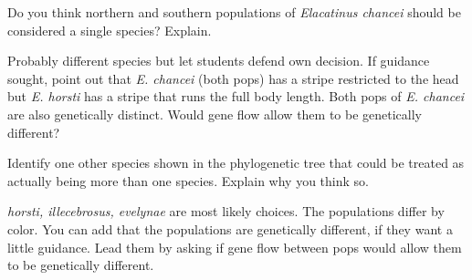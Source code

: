 \documentclass[12pt, hidelinks]{exam}
\newcommand*\AnswerBox[2]{%
    \parbox[t][#1]{0.92\textwidth}{%
    \begin{solution}#2\end{solution}}
    \vspace{\stretch{1}}
}
\begin{document}
\begin{questions}
\question[Checkout]
Do you think northern and southern populations of 
\textit{Elacatinus chancei} should be considered a single species?
Explain.

\AnswerBox{3\baselineskip}{Probably different species but let students defend own decision. 
If guidance sought, point out that \textit{E. chancei} (both pops) has a stripe restricted to the head
but \textit{E. horsti} has a stripe that runs the full body length. Both pops of \textit{E. chancei} are also
genetically distinct. Would gene flow allow them to be genetically different?}

\question[Checkout]
Identify one other species shown in the phylogenetic tree
that could be treated as actually being more than one species. Explain why you think so.

\AnswerBox{3\baselineskip}{\textit{horsti, illecebrosus, evelynae} are most likely choices. 
The populations differ by color. You can add that the populations are genetically different, if 
they want a little guidance. Lead them by asking if gene flow between pops would allow them
to be genetically different.}


%
%

\end{questions}
\end{document}
